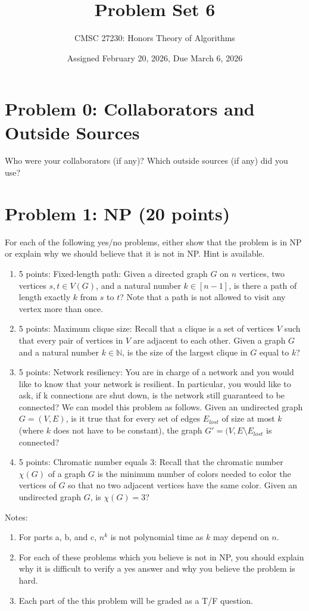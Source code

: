 \documentclass[12pt]{article}
\title{Problem Set 6}
\author{CMSC 27230: Honors Theory of Algorithms}
\date{Assigned February 20, 2026, Due March 6, 2026}
\begin{document}
\maketitle

\thispagestyle{empty}
\section*{Problem 0: Collaborators and Outside Sources}
Who were your collaborators (if any)? Which outside sources (if any) did you use?
\section*{Problem 1: NP (20 points)}
For each of the following yes/no problems, either show that the problem is in NP or explain why we should believe that it is not in NP. Hint is available.
\begin{enumerate}
\item[(a)] 5 points: Fixed-length path: Given a directed graph $G$ on $n$ vertices, two vertices $s,t \in V(G)$, and a natural number $k \in [n-1]$, is there a path of length exactly $k$ from $s$ to $t$? Note that a path is not allowed to visit any vertex more than once.
\item[(b)] 5 points: Maximum clique size: Recall that a clique is a set of vertices $V$ such that every pair of vertices in $V$ are adjacent to each other. Given a graph $G$ and a natural number $k \in \mathbb{N}$, is the size of the largest clique in $G$ equal to $k$?
\item[(c)] 5 points: Network resiliency: You are in charge of a network and you would like to know that your network is resilient. In particular, you would like to ask, if k connections are shut down, is
the network still guaranteed to be connected?
We can model this problem as follows. Given an undirected graph $G = (V,E)$, is it true that for every set of edges $E_{lost}$ of size at most $k$ (where $k$ does not have to be constant), the graph $G' = (V,E \setminus E_{lost}$ is connected?
\item[(d)] 5 points: Chromatic number equals $3$: Recall that the chromatic number $\chi(G)$ of a graph $G$ is the minimum number of colors needed to color the vertices of $G$ so that no two adjacent vertices have the same color. Given an undirected graph $G$, is $\chi(G) = 3$?
\end{enumerate}
Notes:
\begin{enumerate}
\item For parts a, b, and c, $n^{k}$ is not polynomial time as $k$ may depend on $n$.
\item For each of these problems which you believe is not in NP, you should explain why it is difficult to verify a yes answer and why you believe the problem is hard. 
\item Each part of the this problem will be graded as a T/F question.
\end{enumerate}
\end{document}
